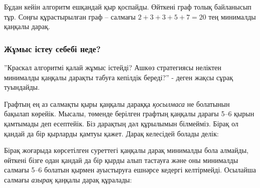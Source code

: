Бұдан кейін
алгоритм ешқандай қыр қоспайды. Өйткені граф толық байланысып тұр.
Соңғы құрастырылған граф -- салмағы $2+3+3+5+7=20$ тең
минималды қаңқалы дарақ.

\subsubsection{Жұмыс істеу себебі неде?}
''Краскал алгоритмі қалай жұмыс істейді? 
Ашкөз стратегиясы неліктен минималды қаңқалы дарақты
табуға кепілдік береді?'' - деген жақсы сұрақ туындайды.

Графтың ең аз салмақты қыры қаңқалы
дараққа \emph{қосылмаса} не болатынын бақылап көрейік.
Мысалы, төменде берілген графтың қаңқалы дарағы
5--6 қырын қамтымады деп есептейік.
Біз дарақтың дәл құрылымын білмейміз. Бірақ
ол қандай да бір қырларды қамтуы қажет.
Дарақ келесідей болады делік:


\begin{center}
\end{center}

Бірақ жоғарыда көрсетілген суреттегі қаңқалы дарақ минималды бола алмайды, өйткені бізге одан қандай да бір қырды алып тастауға және оны минималды салмағы 5--6 болатын қырмен ауыстыруға ешнәрсе кедергі келтірмейді.
Осылайша салмағы \emph{азырақ} қаңқалы дарақ құралады:

